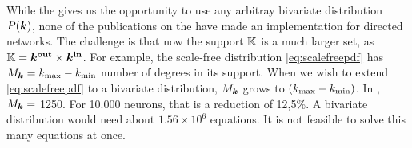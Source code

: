 While the \MFR gives us the opportunity to use any arbitray bivariate distribution $P({\boldsymbol{k}})$, none of the publications on the \MFR have made an implementation for directed networks. The challenge is that now the support ${\mathbb{K}}$ is a much larger set, as ${\mathbb{K}} = \boldsymbol{{k^{\rm out}}} \times {\boldsymbol{k^{\rm in}}}$. For example, the scale-free distribution \eqref{eq:scalefreepdf} has $M_{{\boldsymbol{k}}} = k_{\text{max}} - k_{\text{min}}$ number of degrees in its support. When we wish to extend \eqref{eq:scalefreepdf} to a bivariate distribution, $M_{{\boldsymbol{k}}}$ grows to $\left( \kmax - \kmin \right)$. In \cite{OttAntonsen2017}, $M_{{\boldsymbol{k}}} = $ 1250. For 10.000 neurons, that is a reduction of 12,5\%. A bivariate distribution would need about $1.56 \times 10^6$ equations. It is not feasible to solve this many equations at once.

